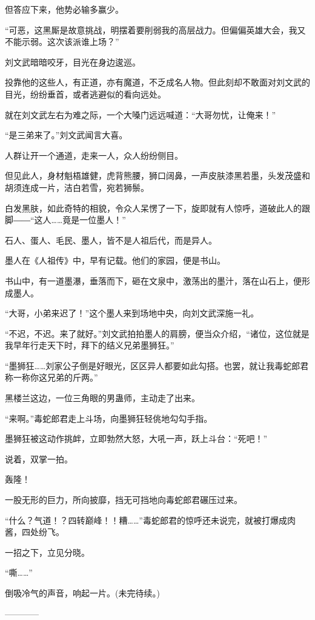 \begin{this_body}
但答应下来，他势必输多赢少。

“可恶，这黑厮是故意挑战，明摆着要削弱我的高层战力。但偏偏英雄大会，我又不能示弱。这次该派谁上场？”

刘文武暗暗咬牙，目光在身边逡巡。

投靠他的这些人，有正道，亦有魔道，不乏成名人物。但此刻却不敢面对刘文武的目光，纷纷垂首，或者逃避似的看向远处。

就在刘文武左右为难之际，一个大嗓门远远喊道：“大哥勿忧，让俺来！”

“是三弟来了。”刘文武闻言大喜。

人群让开一个通道，走来一人，众人纷纷侧目。

但见此人，身材魁梧雄健，虎背熊腰，狮口阔鼻，一声皮肤漆黑若墨，头发茂盛和胡须连成一片，洁白若雪，宛若狮鬃。

白发黑肤，如此奇特的相貌，令众人呆愣了一下，旋即就有人惊呼，道破此人的跟脚――“这人……竟是一位墨人！”

石人、蛋人、毛民、墨人，皆不是人祖后代，而是异人。

墨人在《人祖传》中，早有记载。他们的家园，便是书山。

书山中，有一道墨瀑，垂落而下，砸在文泉中，激荡出的墨汁，落在山石上，便形成墨人。

“大哥，小弟来迟了！”这个墨人来到场地中央，向刘文武深施一礼。

“不迟，不迟。来了就好。”刘文武拍拍墨人的肩膀，便当众介绍，“诸位，这位就是我早年行走天下时，拜下的结义兄弟墨狮狂。”

“墨狮狂……刘家公子倒是好眼光，区区异人都要如此勾搭。也罢，就让我毒蛇郎君称一称你这兄弟的斤两。”

黑楼兰这边，一位三角眼的男蛊师，主动走了出来。

“来啊。”毒蛇郎君走上斗场，向墨狮狂轻佻地勾勾手指。

墨狮狂被这动作挑衅，立即勃然大怒，大吼一声，跃上斗台：“死吧！”

说着，双掌一拍。

轰隆！

一股无形的巨力，所向披靡，挡无可挡地向毒蛇郎君碾压过来。

“什么？气道！？四转巅峰！！糟……”毒蛇郎君的惊呼还未说完，就被打爆成肉酱，四处纷飞。

一招之下，立见分晓。

“嘶……”

倒吸冷气的声音，响起一片。(未完待续。)

------------

\end{this_body}

